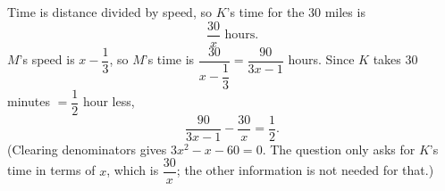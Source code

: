 Time is distance divided by speed, so $K$'s time for the $30$ miles is
\[
\boxed{\dfrac{30}{x}\text{ hours}} .
\]
$M$'s speed is $x-\dfrac{1}{3}$, so $M$'s time is $\dfrac{30}{x-\dfrac{1}{3}}=\dfrac{90}{3x-1}$ hours. Since $K$ takes $30$ minutes $=\dfrac{1}{2}$ hour less,
\[
\dfrac{90}{3x-1}-\dfrac{30}{x}=\dfrac{1}{2} .
\]
(Clearing denominators gives $3x^2-x-60=0$. The question only asks for $K$'s time in terms of $x$, which is $\dfrac{30}{x}$; the other information is not needed for that.)
